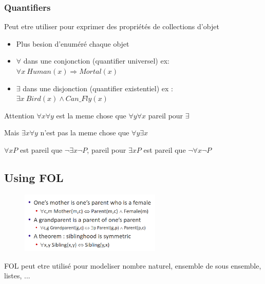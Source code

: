 		\subsubsection{Quantifiers}
			Peut etre utiliser pour exprimer des propriétés de collections d'objet
			\begin{itemize}
				\item Plus besion d'enuméré chaque objet
				\item $\forall$ dans une conjonction (quantifier universel) ex: $\forall x \ Human(x)\Rightarrow Mortal(x)$
				\item $\exists$ dans une disjonction (quantifier existentiel) ex : $\exists x \ Bird(x) \land Can\_Fly(x)$
			\end{itemize}	
			
			Attention $\forall x \forall y$ est la meme chose que $\forall y \forall x$ pareil pour $\exists$
			
			Mais $\exists x \forall y $ n'est pas la meme chose que $\forall y \exists x$  
			
			$\forall x P$ est pareil que $\neg \exists x \neg P$, pareil pour $\exists x P$ est pareil que $\neg \forall x \neg P$
			
	\subsection{Using FOL}
		\begin{figure}[htp]	
			\centering
			\includegraphics[width=0.6\textwidth]{img/FOL3.png}
		\end{figure}
		
		FOL peut etre utilisé pour modeliser nombre naturel, ensemble de sous ensemble, listes, ...
			
